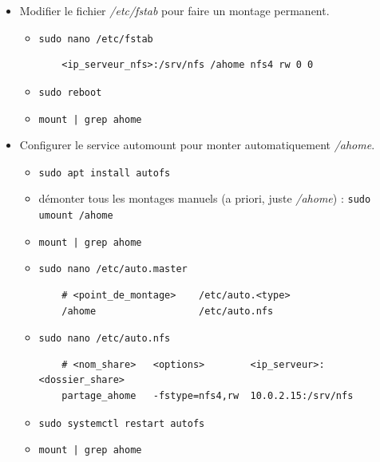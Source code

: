 \documentclass[a4paper]{article}
\begin{document}
\begin{itemize}
\item Modifier le fichier \textit{/etc/fstab} pour faire un montage permanent.
\begin{example}
    \begin{itemize}
        \item \texttt{sudo nano /etc/fstab}
        \begin{verbatim}
    <ip_serveur_nfs>:/srv/nfs /ahome nfs4 rw 0 0
        \end{verbatim}
        \item \texttt{sudo reboot}
        \item \texttt{mount | grep ahome}
    \end{itemize}
\end{example}

\item Configurer le service automount pour monter automatiquement \textit{/ahome}.
\begin{example}
    \begin{itemize}
        \item \texttt{sudo apt install autofs}
        \item démonter tous les montages manuels (a priori, juste \textit{/ahome}) : \texttt{sudo umount /ahome}
        \item \texttt{mount | grep ahome}
        \item \texttt{sudo nano /etc/auto.master}
        \begin{verbatim}
    # <point_de_montage>    /etc/auto.<type>
    /ahome                  /etc/auto.nfs
        \end{verbatim}
        \item \texttt{sudo nano /etc/auto.nfs}
        \begin{verbatim}
    # <nom_share>   <options>        <ip_serveur>:<dossier_share>
    partage_ahome   -fstype=nfs4,rw  10.0.2.15:/srv/nfs
        \end{verbatim}
        \item \texttt{sudo systemctl restart autofs}
        \item \texttt{mount | grep ahome}
    \end{itemize}
\end{example}

\end{itemize}
\end{document}
